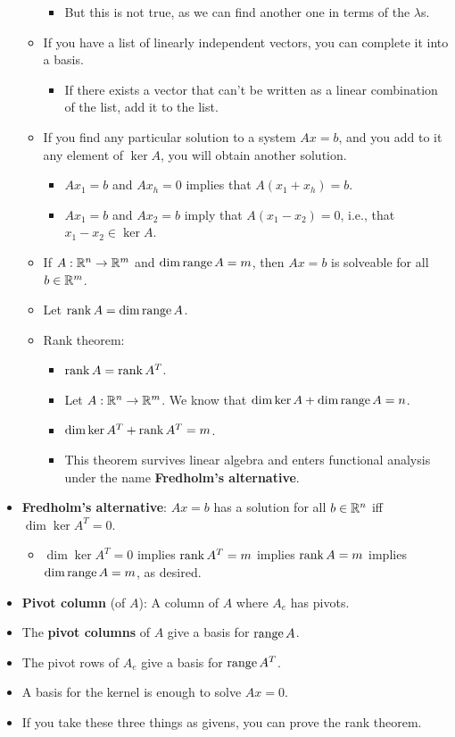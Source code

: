 \documentclass[../../notes.tex]{subfiles}
\begin{document}
\begin{itemize}
\begin{itemize}
\begin{itemize}
            \item But this is not true, as we can find another one in terms of the $\lambda$s.
        \end{itemize}
        \item If you have a list of linearly independent vectors, you can complete it into a basis.
        \begin{itemize}
            \item If there exists a vector that can't be written as a linear combination of the list, add it to the list.
        \end{itemize}
        \item If you find any particular solution to a system $Ax=b$, and you add to it any element of $\ker A$, you will obtain another solution.
        \begin{itemize}
            \item $Ax_1=b$ and $Ax_h=0$ implies that $A(x_1+x_h)=b$.
            \item $Ax_1=b$ and $Ax_2=b$ imply that $A(x_1-x_2)=0$, i.e., that $x_1-x_2\in\ker A$.
        \end{itemize}
        \item If $A:\mathbb{R}^n\to\mathbb{R}^m$ and $\dim\operatorname{range} A=m$, then $Ax=b$ is solveable for all $b\in\mathbb{R}^m$.
        \item Let $\operatorname{rank} A=\dim\operatorname{range} A$.
        \item Rank theorem:
        \begin{itemize}
            \item $\operatorname{rank} A=\operatorname{rank} A^T$.
            \item Let $A:\mathbb{R}^n\to\mathbb{R}^m$. We know that $\dim\ker A+\dim\operatorname{range} A=n$.
            \item $\dim\ker A^T+\operatorname{rank} A^T=m$.
            \item This theorem survives linear algebra and enters functional analysis under the name \textbf{Fredholm's alternative}.
        \end{itemize}
    \end{itemize}
    \item \textbf{Fredholm's alternative}: $Ax=b$ has a solution for all $b\in\mathbb{R}^n$ iff $\dim\ker A^T=0$.
    \begin{itemize}
        \item $\dim\ker A^T=0$ implies $\operatorname{rank} A^T=m$ implies $\operatorname{rank} A=m$ implies $\dim\operatorname{range} A=m$, as desired.
    \end{itemize}
    \item \textbf{Pivot column} (of $A$): A column of $A$ where $A_e$ has pivots.
    \item The \textbf{pivot columns} of $A$ give a basis for $\operatorname{range} A$.
    \item The pivot rows of $A_e$ give a basis for $\operatorname{range} A^T$.
    \item A basis for the kernel is enough to solve $Ax=0$.
    \item If you take these three things as givens, you can prove the rank theorem.
\end{itemize}
\end{document}
